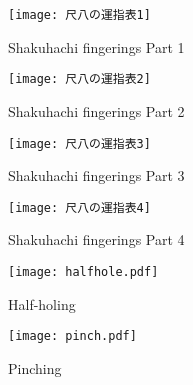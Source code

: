 \begin{figure}[H]
	\centering
	\texttt{[image: 尺八の運指表1]}
	\caption{Shakuhachi fingerings Part 1}
	\label{fig:shakuhachi_fingerings_1}
\end{figure}

\begin{figure}[H]
	\centering
	\texttt{[image: 尺八の運指表2]}
	\caption{Shakuhachi fingerings Part 2}
	\label{fig:shakuhachi_fingerings_2}
\end{figure}

\begin{figure}[H]
	\centering
	\texttt{[image: 尺八の運指表3]}
	\caption{Shakuhachi fingerings Part 3}
	\label{fig:shakuhachi_fingerings_3}
\end{figure}

\begin{figure}[H]
	\centering
	\texttt{[image: 尺八の運指表4]}
	\caption{Shakuhachi fingerings Part 4}
	\label{fig:shakuhachi_fingerings_4}
\end{figure}

\vfill

\begin{figure}
	\centering
	\begin{minipage}{0.9\textwidth}
	\centering
	\texttt{[image: halfhole.pdf]}
	\caption{Half-holing} \label{fig:half-holing}
	\texttt{[image: pinch.pdf]}
	\caption{Pinching} \label{fig:pinching}
	\end{minipage}
\end{figure}
